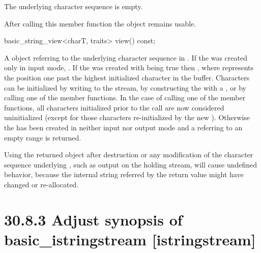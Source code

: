 \documentclass[ebook,11pt,article]{memoir}
\begin{document}
\begin{insrt}
\begin{itemdescr}
\pnum
\postconditions The underlying character sequence is empty.

\pnum
\begin{note}
After calling this member function the  object remains usable.
\end{note}
\end{itemdescr}

\begin{itemdecl}
basic_string_view<charT, traits> view() const;
\end{itemdecl}
\begin{itemdescr}
\pnum
\returns A  object referring to the  underlying character sequence
in . 
If the  was created only in input mode,  
. 
If the  was created with  being true 
then , 
where  represents the position one past the highest initialized character in the buffer. 
Characters can be initialized by writing to the stream, 
by constructing the  with a , 
or by calling one of the  member functions. 
In the case of calling one of the  member functions, 
all characters initialized prior to the call are now considered uninitialized 
(except for those characters re-initialized by the new ). 
Otherwise the  has been created in neither input nor output mode 
and a  referring to an empty range is returned. 

\pnum
\begin{note}
Using the returned  object after destruction or any modification of the character sequence underlying , such as output on the holding stream, will cause undefined behavior, because the internal string referred by the return value might have changed or re-allocated. 
\end{note}
\end{itemdescr}

\end{insrt}
\section{30.8.3 Adjust synopsis of basic\_istringstream [istringstream]}
\end{document}
